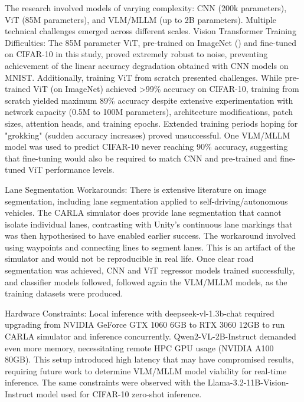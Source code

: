 The research involved models of varying complexity: CNN (200k parameters), ViT (85M parameters), and VLM/MLLM (up to 2B parameters). Multiple technical challenges emerged across different scales.
Vision Transformer Training Difficulties: The 85M parameter ViT, pre-trained on ImageNet (\cite{ImageNetDeng2009}) and fine-tuned on CIFAR-10 in this study, proved extremely robust to noise, preventing achievement of the linear accuracy degradation obtained with CNN models on MNIST. Additionally, training ViT from scratch presented challenges. While pre-trained ViT (on ImageNet) achieved >99\% accuracy on CIFAR-10, training from scratch yielded maximum 89\% accuracy despite extensive experimentation with network capacity (0.5M to 100M parameters), architecture modifications, patch sizes, attention heads, and training epochs. Extended training periods hoping for "grokking" (sudden accuracy increases) proved unsuccessful. One VLM/MLLM model was used to predict CIFAR-10 never reaching 90\% accuracy, suggesting that fine-tuning would also be required to match CNN and pre-trained and fine-tuned ViT performance levels.

Lane Segmentation Workarounds: There is extensive literature on image segmentation, including lane segmentation applied to self-driving/autonomous vehicles. The CARLA simulator does provide lane segmentation that cannot isolate individual lanes, contrasting with Unity's continuous lane markings that was then hypothesised to have enabled earlier success. The workaround involved using waypoints and connecting lines to segment lanes. This is an artifact of the simulator and would not be reproducible in real life. Once clear road segmentation was achieved, CNN and ViT regressor models trained successfully, and classifier models followed, followed again the VLM/MLLM models, as the training datasets were produced.

Hardware Constraints: Local inference with deepseek-vl-1.3b-chat required upgrading from NVIDIA GeForce GTX 1060 6GB to RTX 3060 12GB to run CARLA simulator and inference concurrently. Qwen2-VL-2B-Instruct demanded even more memory, necessitating remote HPC GPU usage (NVIDIA A100 80GB). This setup introduced high latency that may have compromised results, requiring future work to determine VLM/MLLM model viability for real-time inference. The same constraints were observed with the Llama-3.2-11B-Vision-Instruct model used for CIFAR-10 zero-shot inference.
